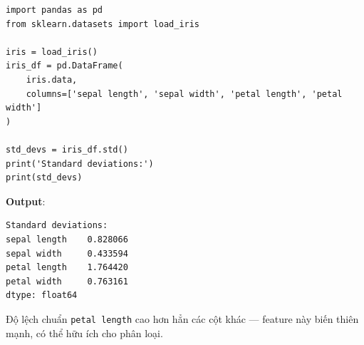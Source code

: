 \begin{vidu}[title={Độ lệch chuẩn từng cột Iris}]
\begin{lstlisting}
import pandas as pd
from sklearn.datasets import load_iris

iris = load_iris()
iris_df = pd.DataFrame(
    iris.data,
    columns=['sepal length', 'sepal width', 'petal length', 'petal width']
)

std_devs = iris_df.std()
print('Standard deviations:')
print(std_devs)
\end{lstlisting}

\textbf{Output}:
\begin{lstlisting}
Standard deviations:
sepal length    0.828066
sepal width     0.433594
petal length    1.764420
petal width     0.763161
dtype: float64
\end{lstlisting}
\end{vidu}

\begin{ynghia}[title={Nhận xét}]
Độ lệch chuẩn \texttt{petal length} cao hơn hẳn các cột khác --- feature này biến thiên mạnh, có thể hữu ích cho phân loại.
\end{ynghia}
